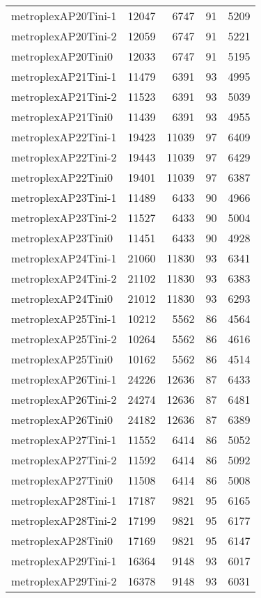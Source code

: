 \begin{longtable}{lrrrr}
metroplexAP20Tini-1 & 12047 & 6747 & 91 & 5209 \\
metroplexAP20Tini-2 & 12059 & 6747 & 91 & 5221 \\
metroplexAP20Tini0 & 12033 & 6747 & 91 & 5195 \\
metroplexAP21Tini-1 & 11479 & 6391 & 93 & 4995 \\
metroplexAP21Tini-2 & 11523 & 6391 & 93 & 5039 \\
metroplexAP21Tini0 & 11439 & 6391 & 93 & 4955 \\
metroplexAP22Tini-1 & 19423 & 11039 & 97 & 6409 \\
metroplexAP22Tini-2 & 19443 & 11039 & 97 & 6429 \\
metroplexAP22Tini0 & 19401 & 11039 & 97 & 6387 \\
metroplexAP23Tini-1 & 11489 & 6433 & 90 & 4966 \\
metroplexAP23Tini-2 & 11527 & 6433 & 90 & 5004 \\
metroplexAP23Tini0 & 11451 & 6433 & 90 & 4928 \\
metroplexAP24Tini-1 & 21060 & 11830 & 93 & 6341 \\
metroplexAP24Tini-2 & 21102 & 11830 & 93 & 6383 \\
metroplexAP24Tini0 & 21012 & 11830 & 93 & 6293 \\
metroplexAP25Tini-1 & 10212 & 5562 & 86 & 4564 \\
metroplexAP25Tini-2 & 10264 & 5562 & 86 & 4616 \\
metroplexAP25Tini0 & 10162 & 5562 & 86 & 4514 \\
metroplexAP26Tini-1 & 24226 & 12636 & 87 & 6433 \\
metroplexAP26Tini-2 & 24274 & 12636 & 87 & 6481 \\
metroplexAP26Tini0 & 24182 & 12636 & 87 & 6389 \\
metroplexAP27Tini-1 & 11552 & 6414 & 86 & 5052 \\
metroplexAP27Tini-2 & 11592 & 6414 & 86 & 5092 \\
metroplexAP27Tini0 & 11508 & 6414 & 86 & 5008 \\
metroplexAP28Tini-1 & 17187 & 9821 & 95 & 6165 \\
metroplexAP28Tini-2 & 17199 & 9821 & 95 & 6177 \\
metroplexAP28Tini0 & 17169 & 9821 & 95 & 6147 \\
metroplexAP29Tini-1 & 16364 & 9148 & 93 & 6017 \\
metroplexAP29Tini-2 & 16378 & 9148 & 93 & 6031 \\

\end{longtable}
